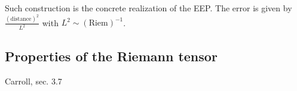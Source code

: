 \documentclass[../main/main.tex]{subfiles}
\begin{document}
Such construction is the concrete realization of the EEP. The error is given by $\frac{(\text{distance})^2}{L^2}$ with $L^2\sim(\text{Riem})^{-1}$.


\subsection{Properties of the Riemann tensor}

\textsf{Carroll, sec. 3.7}
\end{document}
